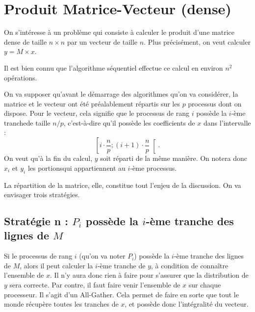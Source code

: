 


\section{Produit Matrice-Vecteur (dense)}

On s'intéresse à un problème qui consiste à calculer le produit d'une
matrice dense de taille $n \times n$ par un vecteur de taille
$n$. Plus précisément, on veut calculer $y = M\times x$.

Il est bien connu que l'algorithme séquentiel effectue ce calcul en
environ $n^2$ opérations.

On va supposer qu'avant le démarrage des algorithmes qu'on va
considérer, la matrice et le vecteur ont été préalablement répartis
sur les $p$ processus dont on dispose. Pour le vecteur, cela signifie
que le processus de rang $i$ possède la $i$-ème \og tranche\fg de
taille $n/p$, c'est-à-dire qu'il possède les coefficients de $x$ dans
l'intervalle :
\[
\left[ i\cdot \frac{n}{p} ; (i+1)\cdot \frac{n}{p} \right[.
\]
On veut qu'à la fin du calcul, $y$ soit réparti de la même manière. On notera
donc $x_i$ et $y_i$ les \og portions\fg qui appartiennent au $i$-ème processus.

La répartition de la matrice, elle, constitue tout l'enjeu de la discussion. On
va envisager trois stratégies.

\subsection{Stratégie n : $P_i$ possède la $i$-ème tranche des
  lignes de $M$}

Si le processus de rang $i$ (qu'on va noter $P_i$) possède la $i$-ème tranche
des lignes de $M$, alors il peut calculer la $i$-ème tranche de $y$, à condition
de connaître l'ensemble de $x$. Il n'y aura donc rien à faire pour s'assurer que
la distribution de $y$ sera correcte. Par contre, il faut \og faire venir\fg
l'ensemble de $x$ sur chaque processeur. Il s'agit d'un \og All-Gather\fg. Cela
permet de faire en sorte que tout le monde récupère toutes les \og tranches\fg
de $x$, et possède donc l'intégralité du vecteur.

\begin{center}
\end{center}

